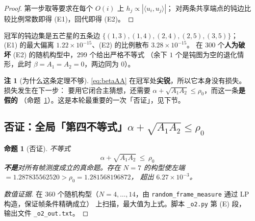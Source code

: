 \documentclass[UTF8,11pt]{ctexart}
\newtheorem{proposition}[theorem]{命题}
\theoremstyle{definition}
\newtheorem{remark}[theorem]{注}
\begin{document}
\begin{proof}
第一步取等要求在每个 $O(i)$ 上 $h_j\propto|\langle u_i,u_j\rangle|$；
对两条共享端点的钝边比较比例常数即得 (E1)，回代即得 (E2)。
\end{proof}

冠军的钝边集是五芒星的五条边 $\{(1,3),(1,4),(2,4),(2,5),(3,5)\}$；
(E1) 的最大偏离 $1.22\times10^{-15}$、(E2) 的比例散布 $3.28\times10^{-15}$。
在 $300$ 个\textbf{人为破坏} (E2) 的随机构型中，$299$ 个给出严格不等式
（余下 $1$ 个是钝图为空的退化情形，此时 $\beta=A_1=A_2=0$，两边同为 $0$）。

\begin{remark}[为什么这条定理不够]\label{rmk:betaAAlimit}
\eqref{eq:betaAA} 在冠军处\textbf{尖锐}，所以它本身没有损失。损失发生在下一步：
要用它闭合主猜想，还需要 $\alpha+\sqrt{A_1A_2}\le\rho_0$，而这一条\textbf{是假的}
（命题~\ref{prop:fourthfalse}）。这是本轮最重要的一次「否证」，见下节。
\end{remark}

\subsection{否证：全局「第四不等式」$\alpha+\sqrt{A_1A_2}\le\rho_0$}\label{sec:r16:refute}

\begin{proposition}[否证]\label{prop:fourthfalse}
不等式
\begin{equation}\label{eq:fourth}
\alpha+\sqrt{A_1A_2}\ \le\ \rho_0
\end{equation}
\textbf{不是}对所有帧测度成立的真命题。存在 $N=7$ 的构型使左端 $=1.287835562520>\rho_0=1.281568196872$，
超出 $6.27\times10^{-3}$。
\end{proposition}

\begin{proof}[数值证据]
在 $360$ 个随机构型（$N=4,\dots,14$，由 \texttt{random\_frame\_measure} 通过 LP 构造，保证帧条件精确成立）
上扫描，最大值为上式。脚本 \texttt{\_o2.py} 第 (E) 段，输出文件 \texttt{\_o2\_out.txt}。
\end{proof}
\end{document}
